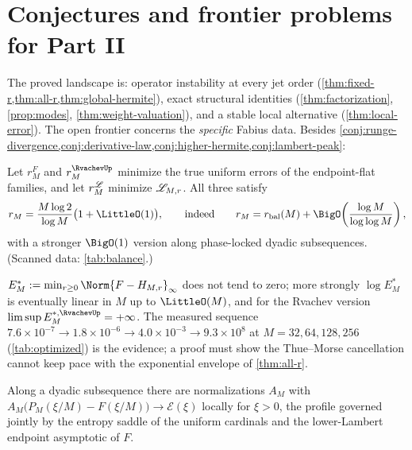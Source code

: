 \section{Conjectures and frontier problems for Part II}
\label{sec:conjectures-interp}

The proved landscape is: operator instability at every jet order
(\cref{thm:fixed-r,thm:all-r,thm:global-hermite}), exact structural
identities (\cref{thm:factorization}, \cref{prop:modes},
\cref{thm:weight-valuation}), and a stable local alternative
(\cref{thm:local-error}).  The open frontier concerns the
\emph{specific} Fabius data.  Besides
\cref{conj:runge-divergence,conj:derivative-law,conj:higher-hermite,conj:lambert-peak}:

\begin{conjecture}
\label{conj:optimal-r}
Let $r^{F}_M$ and $r^{\RvachevUp}_M$ minimize the true uniform errors of the
endpoint-flat families, and let $r^{\mathscr L}_M$ minimize
$\mathscr L_{M,r}$.  All three satisfy
\begin{equation}
 r_M=\frac{M\log2}{\log M}\bigl(1+\LittleO(1)\bigr),
 \qquad\text{indeed}\qquad
 r_M=r_{\mathrm{bal}}(M)+\BigO\!\left(\frac{\log M}{\log\log M}\right),
 \label{eq:optimal-r-conj}
\end{equation}
with a stronger $\BigO(1)$ version along phase-locked dyadic
subsequences.  (Scanned data: \cref{tab:balance}.)
\end{conjecture}

\begin{conjecture}
\label{conj:optimized-divergence}
$E^{*}_M:=\min_{r\ge0}\Norm{F-H_{M,r}}_\infty$ does not tend to zero;
more strongly $\log E^{*}_M$ is eventually linear in $M$ up to
$\LittleO(M)$, and for the Rvachev version
$\limsup E^{*,\RvachevUp}_M=+\infty$.  The measured sequence
$7.6\times10^{-7}\to1.8\times10^{-6}\to4.0\times10^{-3}
\to9.3\times10^{8}$ at $M=32,64,128,256$
(\cref{tab:optimized}) is the evidence; a proof must show the
Thue--Morse cancellation cannot keep pace with the exponential
envelope of \cref{thm:all-r}.
\end{conjecture}

\begin{conjecture}
\label{conj:boundary-profile}
Along a dyadic subsequence there are normalizations $A_M$ with
$A_M\bigl(P_M(\xi/M)-F(\xi/M)\bigr)\to\mathcal E(\xi)$ locally for
$\xi>0$, the profile governed jointly by the entropy saddle of the
uniform cardinals and the lower-Lambert endpoint asymptotic of $F$.
\end{conjecture}

